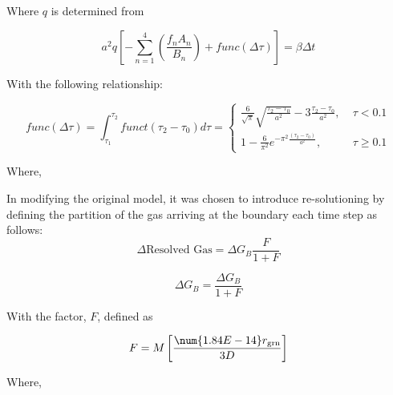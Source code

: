 
Where \(q\) is determined from

\begin{equation}
    \label{eq:forsberg_massih_q}
    a^{2}q\left\lbrack - \sum_{n = 1}^{4}\left( \frac{f_{n}A_{n}}{B_{n}} \right) + func\left( \Delta\tau \right) \right\rbrack = \beta\Delta t
\end{equation}

With the following relationship:

\begin{equation}
    \label{eq:forsberg_massih_funct}
    func\left( \Delta \tau \right) = \int_{\tau_{1}}^{\tau_{2}}funct\left(\tau_2 - \tau_0\right) d \tau = 
    \begin{cases}
        \frac{6}{\sqrt{\pi}}\sqrt{\frac{\tau_2-\tau_0}{a^{2}}}-3\frac{\tau_2-\tau_0}{a^2}, & \; \tau < 0.1 \\
        1-\frac{6}{\pi^2}e^{-\pi^2\frac{\left(\tau_2-\tau_0\right)}{a^2}},                 & \; \tau \geq 0.1
    \end{cases}
\end{equation}

Where,

In modifying the original model, it was chosen to introduce
re-solutioning by defining the partition of the gas arriving at the
boundary each time step as follows:
\begin{equation}
    \Delta \text{Resolved Gas} = \Delta G_{B}  \frac{F}{1+F}
\end{equation}

\begin{equation}
    \Delta G_{B} =\frac{ \Delta G_{B} }{1+F}
\end{equation}

With the factor, \(F\), defined as

\begin{equation}
    F = M\left\lbrack \frac{\num{1.84E-14}r_{\text{grn}}}{3D} \right\rbrack
\end{equation}

Where,

